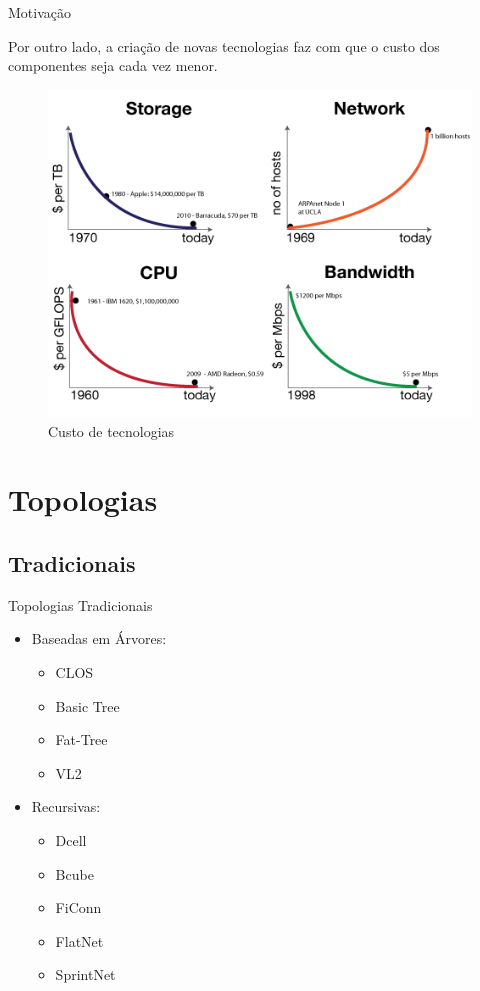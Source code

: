 \documentclass[aspectratio=169]{beamer}
\begin{document}
			
		\begin{frame} {Motivação}
				
			\Large
			Por outro lado, a criação de novas tecnologias faz com que o custo dos componentes seja cada vez menor.
			\begin{figure}[ht]    
						    \includegraphics[scale=0.35]{imagens/custo.png}
						    \caption{Custo de tecnologias}
						    \label{fig:sample_figure}
						\end{figure}
		\end{frame}	
			
		
	
\section{Topologias}
	\subsection{Tradicionais}

	\begin{frame} {Topologias Tradicionais}
	\begin{itemize}
	 	\item
	 		Baseadas em Árvores:
			\begin{itemize}
			 	\item
			 		CLOS
			 	\item
					Basic Tree
			 	\item
					Fat-Tree
			 	\item
					VL2
			 \end{itemize}
	 	\item
	 		Recursivas:
			\begin{itemize}
			 	\item
			 		Dcell
			 	\item
					Bcube
			 	\item
					FiConn
			 	\item
					FlatNet
			 	\item
					SprintNet
			 \end{itemize}
	 \end{itemize}
	\end{frame}
\end{document}
